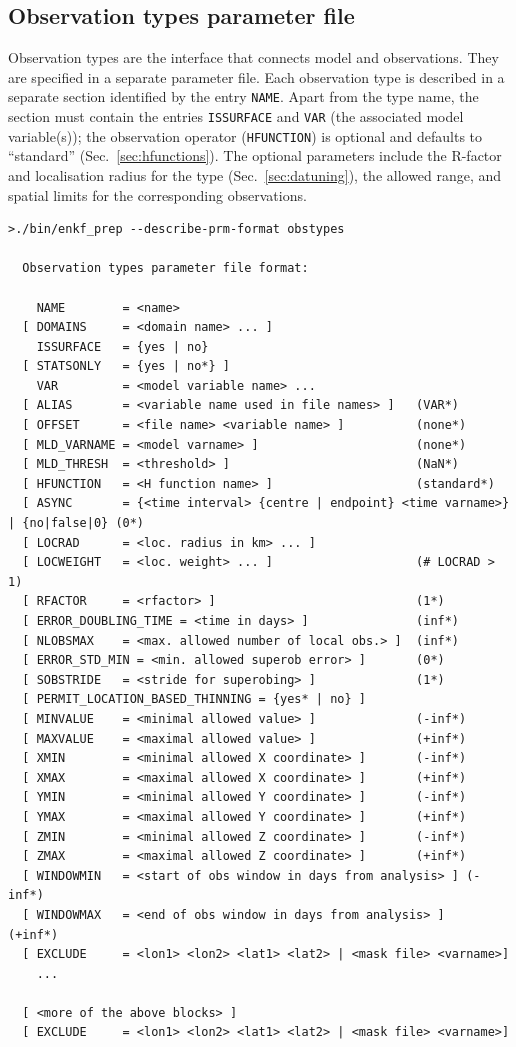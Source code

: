 \documentclass[11pt]{report}
\begin{document}
\subsection{Observation types parameter file}
\label{sec:obstypesprm}

Observation types are the interface that connects model and observations.
They are specified in a separate parameter file.
Each observation type is described in a separate section identified by the entry \verb|NAME|.
Apart from the type name, the section must contain the entries \verb|ISSURFACE| and \verb|VAR| (the associated model variable(s)); the observation operator (\verb|HFUNCTION|) is optional and defaults to ``standard'' (Sec.~\ref{sec:hfunctions}).
The optional parameters include the R-factor and localisation radius for the type (Sec.~\ref{sec:datuning}), the allowed range, and spatial limits for the corresponding observations.
\begin{Verbatim}[frame=single,fontsize=\footnotesize]
>./bin/enkf_prep --describe-prm-format obstypes

  Observation types parameter file format:

    NAME        = <name>
  [ DOMAINS     = <domain name> ... ]
    ISSURFACE   = {yes | no}
  [ STATSONLY   = {yes | no*} ]
    VAR         = <model variable name> ...
  [ ALIAS       = <variable name used in file names> ]   (VAR*)
  [ OFFSET      = <file name> <variable name> ]          (none*)
  [ MLD_VARNAME = <model varname> ]                      (none*)
  [ MLD_THRESH  = <threshold> ]                          (NaN*)
  [ HFUNCTION   = <H function name> ]                    (standard*)
  [ ASYNC       = {<time interval> {centre | endpoint} <time varname>} | {no|false|0} (0*)
  [ LOCRAD      = <loc. radius in km> ... ]
  [ LOCWEIGHT   = <loc. weight> ... ]                    (# LOCRAD > 1)
  [ RFACTOR     = <rfactor> ]                            (1*)
  [ ERROR_DOUBLING_TIME = <time in days> ]               (inf*)
  [ NLOBSMAX    = <max. allowed number of local obs.> ]  (inf*)
  [ ERROR_STD_MIN = <min. allowed superob error> ]       (0*)
  [ SOBSTRIDE   = <stride for superobing> ]              (1*)
  [ PERMIT_LOCATION_BASED_THINNING = {yes* | no} ]
  [ MINVALUE    = <minimal allowed value> ]              (-inf*)
  [ MAXVALUE    = <maximal allowed value> ]              (+inf*)
  [ XMIN        = <minimal allowed X coordinate> ]       (-inf*)
  [ XMAX        = <maximal allowed X coordinate> ]       (+inf*)
  [ YMIN        = <minimal allowed Y coordinate> ]       (-inf*)
  [ YMAX        = <maximal allowed Y coordinate> ]       (+inf*)
  [ ZMIN        = <minimal allowed Z coordinate> ]       (-inf*)
  [ ZMAX        = <maximal allowed Z coordinate> ]       (+inf*)
  [ WINDOWMIN   = <start of obs window in days from analysis> ] (-inf*)
  [ WINDOWMAX   = <end of obs window in days from analysis> ]   (+inf*)
  [ EXCLUDE     = <lon1> <lon2> <lat1> <lat2> | <mask file> <varname>]
    ...
  
  [ <more of the above blocks> ]
  [ EXCLUDE     = <lon1> <lon2> <lat1> <lat2> | <mask file> <varname>]  
\end{Verbatim}
\end{document}
